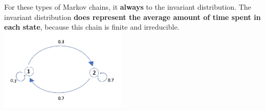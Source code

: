 \begin{enumerate}[label=(\alph*)]
\begin{solution}[2cm]
For these types of Markov chains, it \textbf{always} to the invariant distribution. The invariant distribution \textbf{does represent the average amount of time spent in each state}, because this chain is finite and irreducible. \\
\includegraphics[width=6cm]{aperiodic.png}

\end{solution}


\end{enumerate}